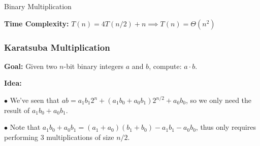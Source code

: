\documentclass[10pt]{article}
\begin{document}
\begin{algorithm}
	\SetAlgoLined
	\caption{Binary Multiplication}
\end{algorithm}

\textbf{Time Complexity:} $T(n) = 4T(n/2) + n\implies T(n) = \Theta(n^2)$

\newpage

\subsubsection{Karatsuba Multiplication}

\textbf{Goal:} Given two $n$-bit binary integers $a$ and $b$, compute: $a\cdot b$.

\textbf{Idea:}

$\bullet$ We've seen that $ab = a_1b_1 2^n + (a_1b_0+a_0b_1) 2^{n/2} + a_0b_0$, so we only need the result of $a_1b_0+a_0b_1$.

$\bullet$ Note that $a_1b_0+a_0b_1 = (a_1+a_0)(b_1+b_0) - a_1b_1 - a_0b_0$, thus only requires performing 3 multiplications of size $n/2$.
\end{document}
